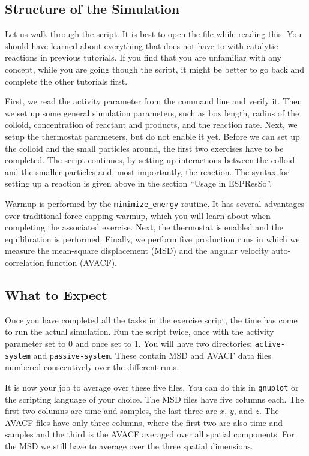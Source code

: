 \documentclass[aip,jcp,reprint,a4paper,onecolumn,nofootinbib,amsmath,amssymb]{revtex4-1}
\newcommand\code{\lstinline}
\newcommand{\es}{\mbox{\textsf{ESPResSo}}\xspace}
\newcommand\codees{\lstinline[language=python]}
\begin{document}
\subsection{Structure of the Simulation}

Let us walk through the script. It is best to open the file while reading this. You should have learned about everything that does not have to with catalytic reactions in previous tutorials. If you find that you are unfamiliar with any concept, while you are going though the script, it might be better to go back and complete the other tutorials first.

First, we read the activity parameter from the command line and verify it. Then we set up some general simulation parameters, such as box length, radius of the colloid, concentration of reactant and products, and the reaction rate. Next, we setup the thermostat parameters, but do not enable it yet. Before we can set up the colloid and the small particles around, the first two exercises have to be completed. The script continues, by setting up interactions between the colloid and the smaller particles and, most importantly, the reaction. The syntax for setting up a reaction is given above in the section ``Usage in \es''.

Warmup is performed by the \codees{minimize_energy} routine. It has several advantages over traditional force-capping warmup, which you will learn about when completing the associated exercise. Next, the thermostat is enabled and the equilibration is performed. Finally, we perform five production runs in which we measure the mean-square displacement (MSD) and the angular velocity auto-correlation function (AVACF).

\subsection{What to Expect}

Once you have completed all the tasks in the exercise script, the time has come to run the actual simulation. Run the script twice, once with the activity parameter set to 0 and once set to 1. You will have two directories: \code{active-system} and \code{passive-system}. These contain MSD and AVACF data files numbered consecutively over the different runs.

It is now your job to average over these five files. You can do this in \code{gnuplot} or the scripting language of your choice. The MSD files have five columns each. The first two columns are time and samples, the last three are $x$, $y$, and $z$. The AVACF files have only three columns, where the first two are also time and samples and the third is the AVACF averaged over all spatial components. For the MSD we still have to average over the three spatial dimensions.
\end{document}
